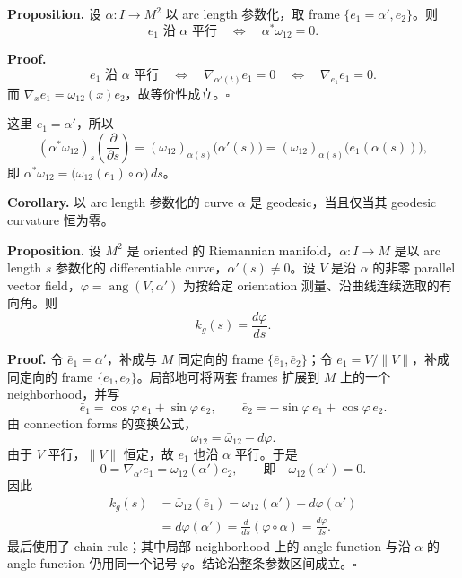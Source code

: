 \documentclass[UTF8,11pt,a4paper]{ctexart}
\begin{document}
\medskip
\textbf{Proposition.} 设 $\alpha\colon I\to M^2$ 以 arc length 参数化，取 frame $\{e_1=\alpha',e_2\}$。则
\[
e_1\text{ 沿 }\alpha\text{ 平行}
\quad\Longleftrightarrow\quad
\alpha^*\omega_{12}=0.
\]

\textbf{Proof.}
\[
e_1\text{ 沿 }\alpha\text{ 平行}
\quad\Longleftrightarrow\quad
\nabla_{\alpha'(t)}e_1=0
\quad\Longleftrightarrow\quad
\nabla_{e_1}e_1=0.
\]
而 $\nabla_xe_1=\omega_{12}(x)e_2$，故等价性成立。\hfill$\square$

这里 $e_1=\alpha'$，所以
\[
(\alpha^*\omega_{12})_s\left(\frac{\partial}{\partial s}\right)
=(\omega_{12})_{\alpha(s)}\bigl(\alpha'(s)\bigr)
=(\omega_{12})_{\alpha(s)}\bigl(e_1(\alpha(s))\bigr),
\]
即 $\alpha^*\omega_{12}=\bigl(\omega_{12}(e_1)\circ\alpha\bigr)\,ds$。

\medskip
\textbf{Corollary.} 以 arc length 参数化的 curve $\alpha$ 是 geodesic，当且仅当其 geodesic curvature 恒为零。

\medskip
\textbf{Proposition.} 设 $M^2$ 是 oriented 的 Riemannian manifold，$\alpha\colon I\to M$ 是以 arc length $s$ 参数化的 differentiable curve，$\alpha'(s)\neq0$。设 $V$ 是沿 $\alpha$ 的非零 parallel vector field，$\varphi=\operatorname{ang}(V,\alpha')$ 为按给定 orientation 测量、沿曲线连续选取的有向角。则
\[
k_g(s)=\frac{d\varphi}{ds}.
\]

\textbf{Proof.} 令 $\bar e_1=\alpha'$，补成与 $M$ 同定向的 frame $\{\bar e_1,\bar e_2\}$；令 $e_1=V/\|V\|$，补成同定向的 frame $\{e_1,e_2\}$。局部地可将两套 frames 扩展到 $M$ 上的一个 neighborhood，并写
\[
\bar e_1=\cos\varphi\,e_1+\sin\varphi\,e_2,
\qquad
\bar e_2=-\sin\varphi\,e_1+\cos\varphi\,e_2.
\]
由 connection forms 的变换公式，
\[
\omega_{12}=\bar\omega_{12}-d\varphi.
\]
由于 $V$ 平行，$\|V\|$ 恒定，故 $e_1$ 也沿 $\alpha$ 平行。于是
\[
0=\nabla_{\alpha'}e_1=\omega_{12}(\alpha')e_2,
\qquad\text{即}\quad\omega_{12}(\alpha')=0.
\]
因此
\begin{align*}
k_g(s)
&=\bar\omega_{12}(\bar e_1)
=\omega_{12}(\alpha')+d\varphi(\alpha')\\
&=d\varphi(\alpha')
=\frac{d}{ds}(\varphi\circ\alpha)
=\frac{d\varphi}{ds}.
\end{align*}
最后使用了 chain rule；其中局部 neighborhood 上的 angle function 与沿 $\alpha$ 的 angle function 仍用同一个记号 $\varphi$。结论沿整条参数区间成立。\hfill$\square$
\end{document}
